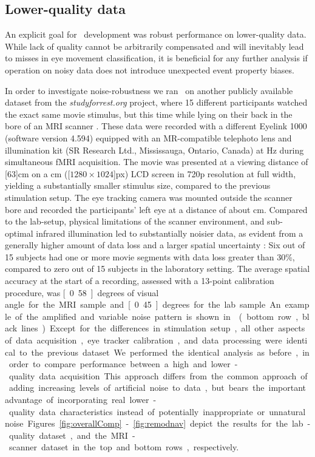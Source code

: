 \subsection*{Lower-quality data}\label{ana_3}

An explicit goal for \remodnav\ development was robust performance on
lower-quality data. While lack of quality cannot be arbitrarily compensated and
will inevitably lead to misses in eye movement classification, it is beneficial for
any further analysis if operation on noisy data does not introduce unexpected
event property biases.

In order to investigate noise-robustness we ran \remodnav\ on another
publicly available dataset from the \textit{studyforrest.org} project, where 15
different participants watched the exact same movie stimulus, but this time
while lying on their back in the bore of an MRI scanner \citep{Hanke2016}.
These data were recorded with a different Eyelink 1000 (software version 4.594)
equipped with an MR-compatible telephoto lens and illumination kit (SR Research
Ltd., Mississauga, Ontario, Canada) at \unit[1000]{Hz} during simultaneous fMRI
acquisition. The movie was presented at a viewing distance of \unit[$63$]{cm}
on a \unit[26]{cm} (\unit[$1280\times1024$]{px}) LCD screen in 720p resolution
at full width, yielding a substantially smaller stimulus size, compared to the
previous stimulation setup. The eye tracking camera was mounted outside the
scanner bore and recorded the participants' left eye at a distance of about
\unit[100]{cm}.  Compared to the lab-setup, physical limitations of the scanner
environment, and sub-optimal infrared illumination led to substantially
noisier data, as evident from a generally higher amount of data loss and a
larger spatial uncertainty \citep[Technical Validation]{Hanke2016}: Six out
of 15 subjects had one or more movie segments with data loss greater than 30\%,
compared to zero out of 15 subjects in the laboratory setting.
The average spatial accuracy at the start of a recording, assessed with a 13-point
calibration procedure, was \unit[0.58]{degrees of visual angle} for the MRI sample and
\unit[0.45]{degrees} for the lab sample.
An example of the amplified and variable noise pattern is shown in  (bottom
row, black lines). Except for the differences in stimulation setup, all other
aspects of data acquisition, eye tracker calibration, and data processing
were identical to the previous dataset.

We performed the identical analysis as before, in order to compare performance
between a high and lower-quality data acquisition. This approach differs from
the common approach of adding increasing levels of artificial noise to data,
but bears the important advantage of incorporating real lower-quality data
characteristics instead of potentially inappropriate or unnatural noise.
Figures~\ref{fig:overallComp}-\ref{fig:remodnav} depict the results for the
lab-quality dataset, and the MRI-scanner dataset in the top and bottom rows,
respectively.

